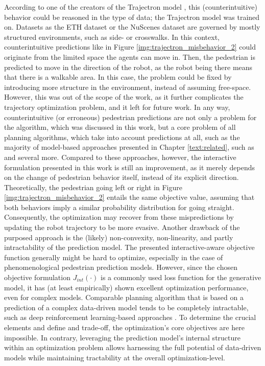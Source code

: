 According to one of the creators of the Trajectron model \cite{Salzmann2020}, this (counterintuitive) behavior could be reasoned in the type of data; the Trajectron model was trained on. Datasets as the ETH dataset \cite{Pellegrini2009} or the NuScenes dataset \cite{Caesar2020} are governed by mostly structured environments, such as side- or crosswalks. In this context, counterintuitive predictions like in Figure \ref{img:trajectron_misbehavior_2} could originate from the limited space the agents can move in. Then, the pedestrian is predicted to move in the direction of the robot, as the robot being there means that there is a walkable area. In this case, the problem could be fixed by introducing more structure in the environment, instead of assuming free-space. However, this was out of the scope of the work, as it further complicates the trajectory optimization problem, and it left for future work. In any way, counterintuitive (or erroneous) pedestrian predictions are not only a problem for the algorithm, which was discussed in this work, but a core problem of all planning algorithms, which take into account predictions at all, such as the majority of model-based approaches presented in Chapter \ref{text:related}, such as \cite{Fox1997}\cite{Phillips2011}\cite{Knepper2012}\cite{Luo2018a}\cite{Nishimura2020a} and several more. Compared to these approaches, however, the interactive formulation presented in this work is still an improvement, as it merely depends on the change of pedestrian behavior itself, instead of its explicit direction. Theoretically, the pedestrian going left or right in Figure \ref{img:trajectron_misbehavior_2} entails the same objective value, assuming that both behaviors imply a similar probability distribution for going straight. Consequently, the optimization may recover from these mispredictions by updating the robot trajectory to be more evasive.
\newline
Another drawback of the purposed approach is the (likely) non-convexity, non-linearity, and partly intractability of the prediction model. The presented interactive-aware objective function generally might be hard to optimize, especially in the case of phenomenological pedestrian prediction models. However, since the chosen objective formulation $J_{int}(\cdot)$ is a commonly used loss function for the generative model, it has (at least empirically) shown excellent optimization performance, even for complex models. Comparable planning algorithm that is based on a prediction of a complex data-driven model tends to be completely intractable, such as deep reinforcement learning-based approaches \cite{Knepper2012}\cite{Chen2017}\cite{Everett2018}. To determine the crucial elements and define and trade-off, the optimization's core objectives are here impossible. In contrary, leveraging the prediction model's internal structure within an optimization problem allows harnessing the full potential of data-driven models while maintaining tractability at the overall optimization-level.
